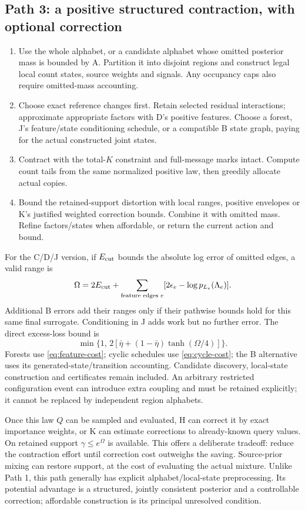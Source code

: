 \documentclass[10pt,a4paper]{article}
\begin{document}
\subsection{Path 3: a positive structured contraction, with optional correction}
\begin{enumerate}
\item Use the whole alphabet, or a candidate alphabet whose omitted posterior mass is bounded by A.
      Partition it into disjoint regions and construct legal local count states, source weights and signals.
      Any occupancy caps also require omitted-mass accounting.
\item Choose exact reference changes first. Retain selected residual interactions; approximate appropriate
      factors with D's positive features. Choose a forest, J's feature/state conditioning schedule, or a
      compatible B state graph, paying for the actual constructed joint states.
\item Contract with the total-$K$ constraint and full-message marks intact. Compute count tails from the
      same normalized positive law, then greedily allocate actual copies.
\item Bound the retained-support distortion with local ranges, positive envelopes or K's justified
      weighted correction bounds. Combine it with omitted mass. Refine factors/states when affordable,
      or return the current action and bound.
\end{enumerate}
For the C/D/J version, if $E_{\rm cut}$ bounds the absolute log error of omitted edges, a valid range is
\[
 \Omega=2E_{\rm cut}+\sum_{\text{feature edges }e}
                  [2\epsilon_e-\log p_{L_e}(\Lambda_e)].
\]
Additional B errors add their ranges only if their pathwise bounds hold for this same final surrogate.
Conditioning in J adds work but no further error.
The direct excess-loss bound is
\[
 \min\{1,\,2[\bar\eta+(1-\bar\eta)\tanh(\Omega/4)]\}.
\]
Forests use \eqref{eq:feature-cost}; cyclic schedules use \eqref{eq:cycle-cost}; the B alternative uses its
generated-state/transition accounting. Candidate discovery, local-state construction and certificates
remain included. An arbitrary restricted configuration event can introduce extra coupling and must be
retained explicitly; it cannot be replaced by independent region alphabets.

Once this law $Q$ can be sampled and evaluated, H can correct it by exact importance weights, or K can
estimate corrections to already-known query values. On retained support $\gamma\leq e^\Omega$ is available.
This offers a deliberate tradeoff: reduce the contraction effort until correction cost outweighs the
saving. Source-prior mixing can restore support, at the cost of evaluating the actual mixture.
Unlike Path 1, this path generally has explicit alphabet/local-state preprocessing. Its potential advantage
is a structured, jointly consistent posterior and a controllable correction; affordable construction is
its principal unresolved condition.
\end{document}
